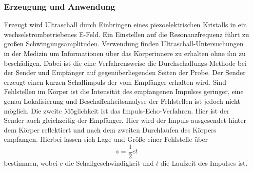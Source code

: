 \subsubsection{Erzeugung und Anwendung}
Erzeugt wird Ultraschall durch Einbringen eines piezoelektrischen Kristalls in ein wechselstrombetriebenes E-Feld. Ein Einstellen auf die Resonanzfrequenz führt zu großen Schwingungsamplituden.\newline
Verwendung finden Ultraschall-Untersuchungen in der Medizin um Informationen über das Körperinnere zu erhalten ohne ihn zu beschädigen.\newline
Dabei ist die eine Verfahrensweise die Durchschallungs-Methode bei der Sender und Empfänger auf gegenüberliegenden Seiten der Probe. Der Sender erzeugt einen kurzen Schallimpuls der vom Empfänger erhalten wird. Sind Fehlstellen im Körper ist die Intensität des empfangenen Impulses geringer, eine genau Lokalisierung und Beschaffenheitsanalyse der Fehlstellen ist jedoch nicht möglich.\newline
Die zweite Möglichkeit ist das Impuls-Echo-Verfahren.
Hier ist der Sender auch gleichzeitig der Empfänger. Hier wird der Impuls ausgesendet hinter dem Körper reflektiert und nach dem zweiten Durchlaufen des Körpers empfangen.
Hierbei lassen sich Lage und Größe einer Fehlstelle über 
\begin{equation}
s=\frac{1}{2}c t
\end{equation}
bestimmen, wobei $c$ die Schallgeschwindigkeit und $t$ die Laufzeit des Impulses ist.